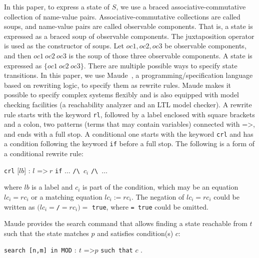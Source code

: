 \documentclass[10pt, conference, compsocconf]{IEEEtran}
\begin{document}
In this paper, to express a state of $S$, we use a braced
associative-commutative collection of name-value
pairs. Associative-commutative collections are called soups, and
name-value pairs are called observable components. That is, a state is
expressed as a braced soup of observable components.  The
juxtaposition operator is used as the constructor of soups. Let $oc1,
oc2, oc3$ be observable components, and then $oc1\ oc2\ oc3$ is the
soup of those three observable components. A state is expressed as
$\{oc1\ oc2\ oc3\}$. There are multiple possible ways to specify state
transitions.  In this paper, we use Maude~\cite{Clavel2007LNCS}, a
programming/specification language based on rewriting logic, to
specify them as rewrite rules.  Maude makes it possible to specify
complex systems flexibly and is also equipped with model checking
facilities (a reachability analyzer and an LTL model checker).
A rewrite rule starts with the keyword \verb!rl!, followed by a label
enclosed with square brackets and a colon, two patterns (terms that
may contain variables) connected with =\textgreater, and ends with a
full stop. A conditional one starts with the keyword \verb!crl! and
has a condition following the keyword \verb!if! before a full stop.
The following is a form of a conditional rewrite rule:

\smallskip
\noindent
\verb!crl! [$lb$] : $l$ =\textgreater $\ r$ \verb!if! $\ldots$ \verb!/\ !$c_i$ \verb!/\ !$\ldots$
\smallskip

\noindent
where $lb$ is a label and $c_i$ is part of the condition, which may be
an equation $lc_i = rc_i$ or a matching equation $lc_i := rc_i$.  The
negation of $lc_i = rc_i$ could be written as $(lc_i =$\verb!/!$=
rc_i) =$ \verb!true!, where \verb!= true! could be omitted.  


Maude provides the search command that allows finding a state reachable from
$t$ such that the state matches $p$ and satisfies condition(s) $c$:

\medskip
	\noindent
	\verb!search [n,m] in MOD! $:\ t$ =\textgreater* $p$ \verb!such that! $c$ .
\medskip
\end{document}

